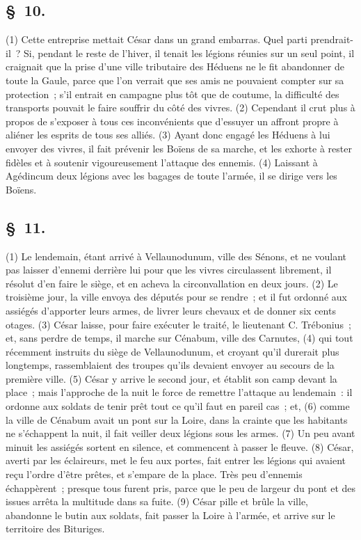 \documentclass[french,twoside]{book} %
\begin{document}
\subsection[{§ 10.}]{ \textsc{§ 10.} }
\noindent (1) Cette entreprise mettait César dans un grand embarras. Quel parti prendrait-il ? Si, pendant le reste de l’hiver, il tenait les légions réunies sur un seul point, il craignait que la prise d’une ville tributaire des Héduens ne le fit abandonner de toute la Gaule, parce que l’on verrait que ses amis ne pouvaient compter sur sa protection ; s’il entrait en campagne plus tôt que de coutume, la difficulté des transports pouvait le faire souffrir du côté des vivres. (2) Cependant il crut plus à propos de s’exposer à tous ces inconvénients que d’essuyer un affront propre à aliéner les esprits de tous ses alliés. (3) Ayant donc engagé les Héduens à lui envoyer des vivres, il fait prévenir les Boïens de sa marche, et les exhorte à rester fidèles et à soutenir vigoureusement l’attaque des ennemis. (4) Laissant à Agédincum deux légions avec les bagages de toute l’armée, il se dirige vers les Boïens.
\subsection[{§ 11.}]{ \textsc{§ 11.} }
\noindent (1) Le lendemain, étant arrivé à Vellaunodunum, ville des Sénons, et ne voulant pas laisser d’ennemi derrière lui pour que les vivres circulassent librement, il résolut d’en faire le siège, et en acheva la circonvallation en deux jours. (2) Le troisième jour, la ville envoya des députés pour se rendre ; et il fut ordonné aux assiégés d’apporter leurs armes, de livrer leurs chevaux et de donner six cents otages. (3) César laisse, pour faire exécuter le traité, le lieutenant C. Trébonius ; et, sans perdre de temps, il marche sur Cénabum, ville des Carnutes, (4) qui tout récemment instruits du siège de Vellaunodunum, et croyant qu’il durerait plus longtemps, rassemblaient des troupes qu’ils devaient envoyer au secours de la première ville. (5) César y arrive le second jour, et établit son camp devant la place ; mais l’approche de la nuit le force de remettre l’attaque au lendemain : il ordonne aux soldats de tenir prêt tout ce qu’il faut en pareil cas ; et, (6) comme la ville de Cénabum avait un pont sur la Loire, dans la crainte que les habitants ne s’échappent la nuit, il fait veiller deux légions sous les armes. (7) Un peu avant minuit les assiégés sortent en silence, et commencent à passer le fleuve. (8) César, averti par les éclaireurs, met le feu aux portes, fait entrer les légions qui avaient reçu l’ordre d’être prêtes, et s’empare de la place. Très peu d’ennemis échappèrent ; presque tous furent pris, parce que le peu de largeur du pont et des issues arrêta la multitude dans sa fuite. (9) César pille et brûle la ville, abandonne le butin aux soldats, fait passer la Loire à l’armée, et arrive sur le territoire des Bituriges.
\end{document}
